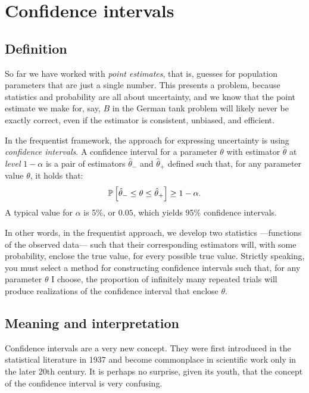 
\chapter{Confidence intervals}

\section{Definition}

So far we have worked with \emph{point estimates}, that is, guesses for
population parameters that are just a single number. This presents a problem,
because statistics and probability are all about uncertainty, and we know that
the point estimate we make for, say, $B$ in the German tank problem will likely
never be exactly correct, even if the estimator is consistent, unbiased, and
efficient.

In the frequentist framework, the approach for expressing uncertainty is using
\emph{confidence intervals}. A confidence interval for a parameter $\theta$ with estimator $\hat{\theta}$
at \emph{level} $1-\alpha$ is a pair of estimators $\hat{\theta}_-$ and $\hat{\theta}_+$
defined such that, for any parameter value $\theta$, it holds that:
\begin{equation}
  \mathbb{P}\left[{\hat{\theta}_- \leq \theta \leq \hat{\theta}_+}\right] \geq 1 - \alpha.
\end{equation}
A typical value for $\alpha$ is 5\%, or $0.05$, which yields 95\% confidence intervals.

In other words, in the frequentist approach, we develop two statistics ---functions
of the observed data--- such that their corresponding estimators will, with some
probability, enclose the true value, for every possible true value. Strictly speaking,
you must select a method for constructing confidence intervals such that, for any
parameter $\theta$ I choose, the proportion of infinitely many repeated trials will
produce realizations of the confidence interval that enclose $\theta$.

\section{Meaning and interpretation}

Confidence intervals are a very new concept. They were first introduced in the statistical literature in 1937 and become commonplace in scientific work only in the later 20th century.
It is perhaps no surprise, given its youth, that the concept of the confidence interval
is very confusing.

